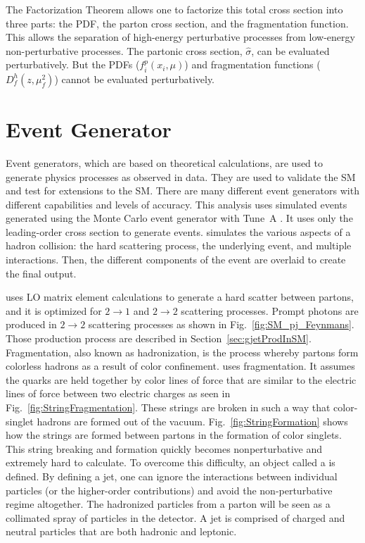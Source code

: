 The Factorization Theorem allows one to factorize this total cross section into three parts: the PDF, the parton cross section, and the fragmentation function. This allows the separation of high-energy perturbative processes from low-energy non-perturbative processes. The partonic cross section, $\hat{\sigma}$, can be evaluated perturbatively. But the PDFs ($f_{i}^{p}(x_{i},\mu)$) and fragmentation functions ($D_{f}^{h}(z,\mu^{2}_{f})$) cannot be evaluated perturbatively.

\section{\pythiaText Event Generator}
Event generators, which are based on theoretical calculations, are used to generate physics processes as observed in data. They are used to validate the SM and test for extensions to the SM. There are many different event generators with different capabilities and levels of accuracy. This analysis uses simulated events generated using the \pythiaText Monte Carlo event generator with Tune~A \cite{pap:PythiaManual}. It uses only the leading-order cross section to generate events. \pythiaText simulates the various aspects of a hadron collision: the hard scattering process, the underlying event, and multiple interactions. Then, the different components of the event are overlaid to create the final output.

\pythiaText uses LO matrix element calculations to generate a hard scatter between partons, and it is optimized for $2\to1$ and $2\to2$ scattering processes. Prompt photons are produced in $2\to2$ scattering processes as shown in Fig.~\ref{fig:SM_pj_Feynmans}. Those production process are described in Section~\ref{sec:gjetProdInSM}. Fragmentation, also known as hadronization, is the process whereby partons form colorless hadrons as a result of color confinement. \pythiaText uses  fragmentation. It assumes the quarks are held together by color lines of force that are similar to the electric lines of force between two electric charges as seen in Fig.~\ref{fig:StringFragmentation}. These strings are broken in such a way that color-singlet hadrons are formed out of the vacuum. Fig.~\ref{fig:StringFormation} shows how the strings are formed between partons in the formation of color singlets. This string breaking and formation quickly becomes nonperturbative and extremely hard to calculate. To overcome this difficulty, an object called a  is defined. By defining a jet, one can ignore the interactions between individual particles (or the higher-order contributions) and avoid the non-perturbative regime altogether. The hadronized particles from a parton will be seen as a collimated spray of particles in the detector. A jet is comprised of charged and neutral particles that are both hadronic and leptonic.

